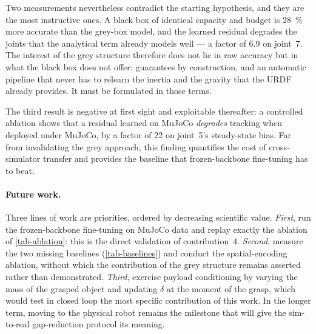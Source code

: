 \documentclass[a4paper, oneside]{article}
\begin{document}
Two measurements nevertheless contradict the starting hypothesis, and they are
the most instructive ones. A black box of identical capacity and budget is
\SI{28}{\percent} more accurate than the grey-box model, and the learned
residual degrades the joints that the analytical term already models well ---
a factor of \num{6.9} on joint~7. The interest of the grey structure therefore
does not lie in raw accuracy but in what the black box does not offer:
guarantees by construction, and an automatic pipeline that never has to relearn
the inertia and the gravity that the URDF already provides. It must be
formulated in those terms.

The third result is negative at first sight and exploitable thereafter: a
controlled ablation shows that a residual learned on MuJoCo \emph{degrades}
tracking when deployed under MuJoCo, by a factor of \num{22} on joint~5's
steady-state bias. Far from invalidating the grey approach, this finding
quantifies the cost of cross-simulator transfer and provides the baseline that
frozen-backbone fine-tuning has to beat.

\paragraph{Future work.} Three lines of work are priorities, ordered by
decreasing scientific value. \emph{First}, run the frozen-backbone fine-tuning
on MuJoCo data and replay exactly the ablation of \cref{tab-ablation}: this is
the direct validation of contribution~4. \emph{Second}, measure the two missing
baselines (\cref{tab-baselines}) and conduct the spatial-encoding ablation,
without which the contribution of the grey structure remains asserted rather
than demonstrated. \emph{Third}, exercise payload conditioning by varying the
mass of the grasped object and updating $\delta$ at the moment of the grasp,
which would test in closed loop the most specific contribution of this work. In
the longer term, moving to the physical robot remains the milestone that will
give the sim-to-real gap-reduction protocol its meaning.

\printbibliography[title={References}]
\end{document}

